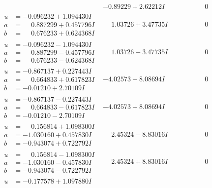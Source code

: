 \documentclass[1p]{elsarticle_modified}
\theoremstyle{definition}
\begin{document}
$$\begin{array}{c|c|c}
 & -0.89229 + 2.62212 I & \phantom{-0.000000 } 0 \\ \hline\begin{aligned}
u &= -0.096232 + 1.094430 I \\
a &= \phantom{-}0.887299 + 0.457796 I \\
b &= \phantom{-}0.676233 + 0.624368 I\end{aligned}
 & \phantom{-}1.03726 + 3.47735 I & \phantom{-0.000000 } 0 \\ \hline\begin{aligned}
u &= -0.096232 - 1.094430 I \\
a &= \phantom{-}0.887299 - 0.457796 I \\
b &= \phantom{-}0.676233 - 0.624368 I\end{aligned}
 & \phantom{-}1.03726 - 3.47735 I & \phantom{-0.000000 } 0 \\ \hline\begin{aligned}
u &= -0.867137 + 0.227443 I \\
a &= \phantom{-}0.664833 + 0.617823 I \\
b &= -0.01210 + 2.70109 I\end{aligned}
 & -4.02573 - 8.08694 I & \phantom{-0.000000 } 0 \\ \hline\begin{aligned}
u &= -0.867137 - 0.227443 I \\
a &= \phantom{-}0.664833 - 0.617823 I \\
b &= -0.01210 - 2.70109 I\end{aligned}
 & -4.02573 + 8.08694 I & \phantom{-0.000000 } 0 \\ \hline\begin{aligned}
u &= \phantom{-}0.156814 + 1.098300 I \\
a &= -1.030160 + 0.457830 I \\
b &= -0.943074 + 0.722792 I\end{aligned}
 & \phantom{-}2.45324 - 8.83016 I & \phantom{-0.000000 } 0 \\ \hline\begin{aligned}
u &= \phantom{-}0.156814 - 1.098300 I \\
a &= -1.030160 - 0.457830 I \\
b &= -0.943074 - 0.722792 I\end{aligned}
 & \phantom{-}2.45324 + 8.83016 I & \phantom{-0.000000 } 0 \\ \hline\begin{aligned}
u &= -0.177578 + 1.097880 I \\

\end{aligned}
\end{array}$$
\end{document}
